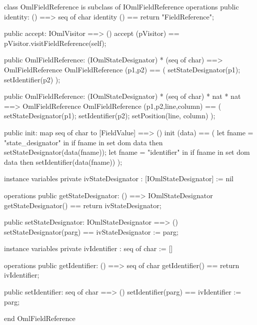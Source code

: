 \begin{vdm_al}
class OmlFieldReference is subclass of IOmlFieldReference
operations
  public identity: () ==> seq of char
  identity () == return "FieldReference";

  public accept: IOmlVisitor ==> ()
  accept (pVisitor) == pVisitor.visitFieldReference(self);

  public OmlFieldReference:
    (IOmlStateDesignator) *
    (seq of char) ==> OmlFieldReference
  OmlFieldReference (p1,p2) == 
    ( setStateDesignator(p1);
      setIdentifier(p2) );

  public OmlFieldReference:
    (IOmlStateDesignator) *
    (seq of char) *
    nat *
    nat ==> OmlFieldReference
  OmlFieldReference (p1,p2,line,column) == 
    ( setStateDesignator(p1);
      setIdentifier(p2);
      setPosition(line, column) );

  public init: map seq of char to [FieldValue] ==> ()
  init (data) ==
    ( let fname = "state_designator" in
        if fname in set dom data
        then setStateDesignator(data(fname));
      let fname = "identifier" in
        if fname in set dom data
        then setIdentifier(data(fname)) );

instance variables
  private ivStateDesignator : [IOmlStateDesignator] := nil

operations
  public getStateDesignator: () ==> IOmlStateDesignator
  getStateDesignator() == return ivStateDesignator;

  public setStateDesignator: IOmlStateDesignator ==> ()
  setStateDesignator(parg) == ivStateDesignator := parg;

instance variables
  private ivIdentifier : seq of char := []

operations
  public getIdentifier: () ==> seq of char
  getIdentifier() == return ivIdentifier;

  public setIdentifier: seq of char ==> ()
  setIdentifier(parg) == ivIdentifier := parg;

end OmlFieldReference
\end{vdm_al}

